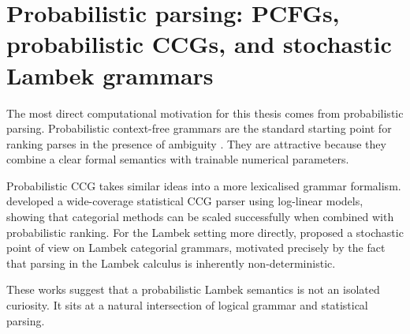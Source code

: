 \section{Probabilistic parsing: PCFGs, probabilistic CCGs, and stochastic Lambek grammars}
The most direct computational motivation for this thesis comes from probabilistic parsing.
Probabilistic context-free grammars are the standard starting point for ranking parses in the
presence of ambiguity \citep{ManningSchutze1999}. They are attractive because they combine a
clear formal semantics with trainable numerical parameters.

Probabilistic CCG takes similar ideas into a more lexicalised grammar formalism.
\citet{ClarkCurran2007} developed a wide-coverage statistical CCG parser using log-linear models,
showing that categorial methods can be scaled successfully when combined with probabilistic
ranking. For the Lambek setting more directly, \citet{BonfanteDeGroote2004} proposed a
stochastic point of view on Lambek categorial grammars, motivated precisely by the fact that
parsing in the Lambek calculus is inherently non-deterministic.

These works suggest that a probabilistic Lambek semantics is not an isolated curiosity. It sits at
a natural intersection of logical grammar and statistical parsing.

